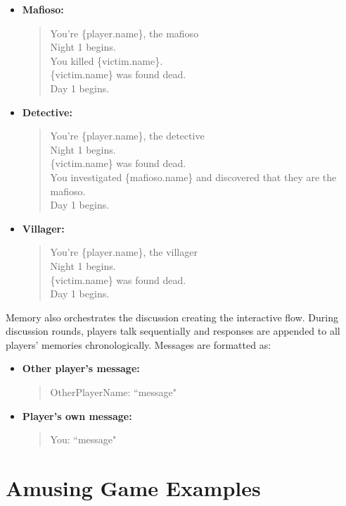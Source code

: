 \documentclass{article}
\begin{document}
\begin{itemize}
    \item \textbf{Mafioso:}
    \begin{quote}
    You're \{player.name\}, the mafioso\\
    Night 1 begins.\\
    You killed \{victim.name\}.\\
    \{victim.name\} was found dead.\\
    Day 1 begins.
    \end{quote}
    
    \item \textbf{Detective:}
    \begin{quote}
    You're \{player.name\}, the detective\\
    Night 1 begins.\\
    \{victim.name\} was found dead.\\
    You investigated \{mafioso.name\} and discovered that they are the mafioso.\\
    Day 1 begins.
    \end{quote}
    
    \item \textbf{Villager:}
    \begin{quote}
    You're \{player.name\}, the villager\\
    Night 1 begins.\\
    \{victim.name\} was found dead.\\
    Day 1 begins.
    \end{quote}
\end{itemize}

Memory also orchestrates the discussion creating the interactive flow. During discussion rounds, players talk sequentially and responses are appended to all players' memories chronologically. Messages are formatted as:

\begin{itemize}
    \item \textbf{Other player's message:}
    \begin{quote}
        OtherPlayerName: ``message"
    \end{quote}
    \item \textbf{Player's own message:}
    \begin{quote}
        You: ``message"
    \end{quote}
\end{itemize}


\section{Amusing Game Examples}
\label{appendix:exceptional_games}
\end{document}
